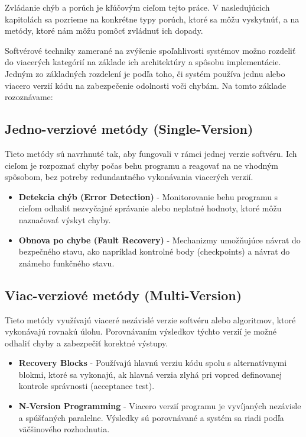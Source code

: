 \documentclass[12pt, letterpaper]{article}
\begin{document}
Zvládanie chýb a porúch je kľúčovým cieľom tejto práce. V nasledujúcich kapitolách sa pozrieme na konkrétne typy porúch, ktoré sa môžu vyskytnúť, a na metódy, ktoré nám môžu pomôcť zvládnuť ich dopady.

Softvérové techniky zamerané na zvýšenie spoľahlivosti systémov možno rozdeliť do viacerých kategórií na základe ich architektúry a spôsobu implementácie. Jedným zo základných rozdelení je podľa toho, či systém používa jednu alebo viacero verzií kódu na zabezpečenie odolnosti voči chybám. Na tomto základe rozoznávame:

\subsection*{Jedno-verziové metódy (Single-Version)}

Tieto metódy sú navrhnuté tak, aby fungovali v rámci jednej verzie softvéru. Ich cieľom je rozpoznať chyby počas behu programu a reagovať na ne vhodným spôsobom, bez potreby redundantného vykonávania viacerých verzií.

\begin{itemize}
\item \textbf{Detekcia chýb (Error Detection)} - Monitorovanie behu programu s cieľom odhaliť nezvyčajné správanie alebo neplatné hodnoty, ktoré môžu naznačovať výskyt chyby.
\item \textbf{Obnova po chybe (Fault Recovery)} - Mechanizmy umožňujúce návrat do bezpečného stavu, ako napríklad kontrolné body (checkpoints) a návrat do známeho funkčného stavu.
\end{itemize}

\subsection*{Viac-verziové metódy (Multi-Version)}

Tieto metódy využívajú viaceré nezávislé verzie softvéru alebo algoritmov, ktoré vykonávajú rovnakú úlohu. Porovnávaním výsledkov týchto verzií je možné odhaliť chyby a zabezpečiť korektné výstupy.

\begin{itemize}
\item \textbf{Recovery Blocks} - Používajú hlavnú verziu kódu spolu s alternatívnymi blokmi, ktoré sa vykonajú, ak hlavná verzia zlyhá pri vopred definovanej kontrole správnosti (acceptance test).
\item \textbf{N-Version Programming} - Viacero verzií programu je vyvíjaných nezávisle a spúšťaných paralelne. Výsledky sú porovnávané a systém sa riadi podľa väčšinového rozhodnutia.
\end{itemize}
\end{document}
